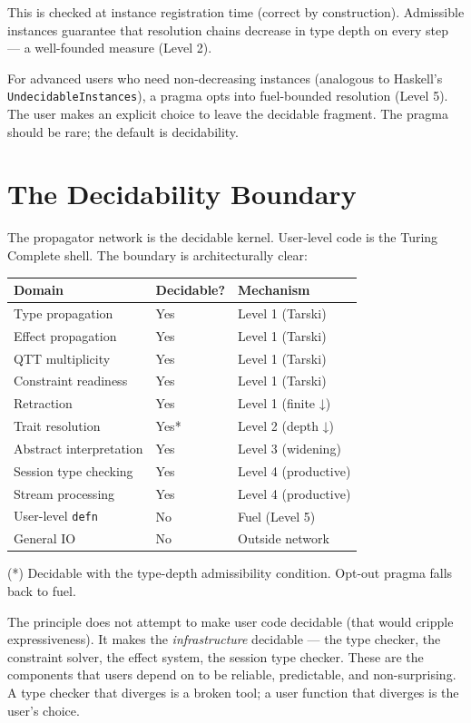 \documentclass[11pt]{article}
\begin{document}
This is checked at instance registration time (correct by
construction). Admissible instances guarantee that resolution chains
decrease in type depth on every step --- a well-founded measure
(Level 2).

For advanced users who need non-decreasing instances (analogous to
Haskell's \texttt{UndecidableInstances}), a pragma opts into fuel-bounded
resolution (Level 5). The user makes an explicit choice to leave
the decidable fragment. The pragma should be rare; the default is
decidability.
\section{The Decidability Boundary}
\label{sec:orge9b4ff4}

The propagator network is the decidable kernel. User-level code is
the Turing Complete shell. The boundary is architecturally clear:

\begin{center}
\begin{tabular}{lll}
Domain & Decidable? & Mechanism\\
\hline
Type propagation & Yes & Level 1 (Tarski)\\
Effect propagation & Yes & Level 1 (Tarski)\\
QTT multiplicity & Yes & Level 1 (Tarski)\\
Constraint readiness & Yes & Level 1 (Tarski)\\
Retraction & Yes & Level 1 (finite ↓)\\
Trait resolution & Yes* & Level 2 (depth ↓)\\
Abstract interpretation & Yes & Level 3 (widening)\\
Session type checking & Yes & Level 4 (productive)\\
Stream processing & Yes & Level 4 (productive)\\
User-level \texttt{defn} & No & Fuel (Level 5)\\
General IO & No & Outside network\\
\end{tabular}
\end{center}

(*) Decidable with the type-depth admissibility condition. Opt-out
pragma falls back to fuel.

The principle does not attempt to make user code decidable (that
would cripple expressiveness). It makes the \emph{infrastructure} decidable
--- the type checker, the constraint solver, the effect system, the
session type checker. These are the components that users depend on
to be reliable, predictable, and non-surprising. A type checker that
diverges is a broken tool; a user function that diverges is the
user's choice.
\end{document}
